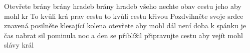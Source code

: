\begin{TEXT}{Otevřete brány}
\SLOKA {} brány hradeb  \NL
{} brány hradeb  \NL
{}    \NL
{} všeho nechte obav  \NL
{} cestu jeho  \NL
{}  aby  mohl  kr
\REFREN  To kvůli krá prav  cestu \NL
{}  \NL
to kvůli    cestu \NL
{} křivou  
\SLOKA Pozdvihněte svoje srdce znavená \NL
posilněte klesající kolena \NL
otevřete aby mohl dál \NL
není doba k spánku je čas nabrat sil \NL
pominula noc a den se přiblížil \NL
připravujte cestu aby vejít mohl slávy král \NL
\end{TEXT}
